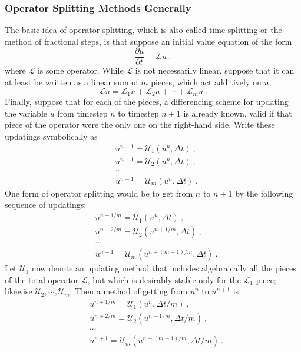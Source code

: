 \documentclass[12pt,a4paper]{article}
\begin{document}
\subsubsection{Operator Splitting Methods Generally}
The basic idea of operator splitting, which is also called time splitting or the method of fractional steps, is that suppose an initial value equation of the form
\begin{equation}
\frac{\partial u}{\partial t} = \mathscr L u ~,
\end{equation}
where $\mathscr L$ is some operator. While $\mathscr L$ is not necessarily linear, suppose that it can at least be written as a linear sum of $m$ pieces, which act additively on $u$,
\begin{equation}
\mathscr L u = \mathscr L_1 u +\mathscr L_2 u +\cdots +\mathscr L_m u ~.
\end{equation}
Finally, suppose that for each of the pieces, a differencing scheme for updating the variable $u$ from timestep $n$ to timestep $n+1$ is already known, valid if that piece of the operator were the only one on the right-hand side. Write these updatings symbolically as
\begin{align}
\nonumber & u^{n+1} = \mathscr U_1(u^n, \Delta t) ~, \\
\nonumber & u^{n+1} = \mathscr U_2(u^n, \Delta t) ~, \\
\nonumber & \cdots \\
& u^{n+1} = \mathscr U_m(u^n, \Delta t) ~.
\end{align}
One form of operator splitting would be to get from $n$ to $n+1$ by the following sequence of updatings:
\begin{align}
\nonumber & u^{n+1/m} = \mathscr U_1(u^n, \Delta t) ~, \\
\nonumber & u^{n+2/m} = \mathscr U_2(u^{n+1/m}, \Delta t) ~, \\
\nonumber & \cdots \\
& u^{n+1} = \mathscr U_m(u^{n+(m-1)/m}, \Delta t) ~.
\end{align}
Let $\mathscr U_1$ now denote an updating method that includes algebraically all the pieces of the total operator $\mathscr L$, but which is desirably stable only for the $\mathscr L_1$ piece; likewise $\mathscr U_2, \cdots, \mathscr U_m$. Then a method of getting from $u^n$ to $u^{n+1}$ is
\begin{align}
\nonumber & u^{n+1/m} = \mathscr U_1(u^n, \Delta t/m) ~, \\
\nonumber & u^{n+2/m} = \mathscr U_2(u^{n+1/m}, \Delta t/m) ~, \\
\nonumber & \cdots \\
& u^{n+1} = \mathscr U_m(u^{n+(m-1)/m}, \Delta t/m) ~.
\end{align}
\end{document}
